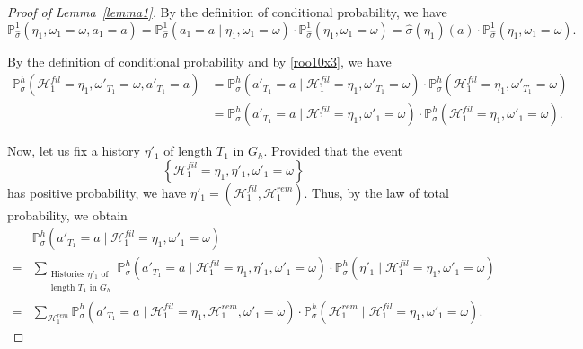 \documentclass[english,openary,11pt]{article}
\theoremstyle{definition}
\renewcommand{\P}{\mathbb{P}}
\begin{document}
\begin{proof}[Proof of Lemma~\ref{lemma1}]
By the definition of conditional probability, we have
\begin{equation}
\P_{\widehat \sigma}^1(\eta_1, \omega_1 = \omega, a_1 = a) = \P_{\widehat \sigma}^1(a_1 = a \mid \eta_1, \omega_1 = \omega) \cdot \P_{\widehat \sigma}^1(\eta_1, \omega_1 = \omega) = \widehat \sigma(\eta_1)(a) \cdot \P_{\widehat \sigma}^1(\eta_1, \omega_1 = \omega).
\label{tralala2}
\end{equation}

By the definition of conditional probability and by \eqref{roo10x3}, we have
\begin{equation}
\begin{aligned}
\P_{\sigma}^h(\mathcal H^{fil}_1 = \eta_1, \omega'_{T_1} = \omega, a'_{T_1} = a) 
&= \P_{\sigma}^h(a'_{T_1} = a \mid \mathcal H^{fil}_1 = \eta_1, \omega'_{T_1} = \omega) \cdot \P_{\sigma}^h(\mathcal H^{fil}_1 = \eta_1, \omega'_{T_1} = \omega) \\
&= \P_{\sigma}^h(a'_{T_1} = a \mid \mathcal H^{fil}_1 = \eta_1, \omega'_{1} = \omega) \cdot \P_{\sigma}^h(\mathcal H^{fil}_1 = \eta_1, \omega'_{1} = \omega).
\end{aligned}
\label{tralala3}
\end{equation}

Now, let us fix a history $\eta'_{1}$ of length $T_1$ in $G_h$. Provided that the event 
$$\left\{\mathcal H^{fil}_1 = \eta_1, \eta'_{1}, \omega'_{1} = \omega\right\}$$
has positive probability, we have $\eta'_{1} = \left(\mathcal H^{fil}_1, \mathcal H^{rem}_1\right)$. Thus, by the law of total probability, we obtain
\begin{equation}
\begin{aligned}
&\P_{\sigma}^h (a'_{T_1} = a \mid \mathcal H^{fil}_1 = \eta_1, \omega'_{1} = \omega) 
\\
=&
\sum_{\substack{\text{Histories } \eta'_{1} \text{ of} \\ \text{length } T_{1} \text{ in } G_h}}
\P_{\sigma}^h (a'_{T_1} = a \mid \mathcal H^{fil}_1 = \eta_1, \eta'_{1}, \omega'_{1} = \omega) \cdot 
\P_{\sigma}^h (\eta'_{1} \mid \mathcal H^{fil}_1 = \eta_1, \omega'_{1} = \omega) \\
=&
\sum_{\mathcal H^{rem}_1}
\P_{\sigma}^h (a'_{T_1} = a \mid \mathcal H^{fil}_1 = \eta_1, \mathcal H^{rem}_1, \omega'_{1} = \omega) \cdot 
\P_{\sigma}^h (\mathcal H^{rem}_1 \mid \mathcal H^{fil}_1 = \eta_1, \omega'_{1} = \omega).
\end{aligned}
\label{tralala4}
\end{equation}


\end{proof}
\end{document}
